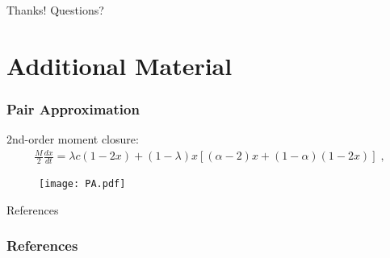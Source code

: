 \documentclass{beamer}
\begin{document}
		\begin{frame}[standout]
			Thanks! Questions? 
		\end{frame}
\section{Additional Material}
		
		\begin{frame}\frametitle{Pair Approximation}
		  	2nd-order moment closure: 
			\begin{align}
				\frac{M}{2}\frac{dx}{dt} = \lambda c(1-2x) + (1-\lambda) x\left[(\alpha - 2)x + (1-\alpha)(1-2x) \right]\;,
			\end{align}
			\begin{figure}
				\centering
				\texttt{[image: PA.pdf]}
				\caption{} \label{fig:}
			\end{figure}
		  	
		\end{frame}
	
	
		\begin{frame}[standout]
		References
		  
		\end{frame}

	
		\begin{frame}[allowframebreaks]\frametitle{References}
		 	
		 	\printbibliography[heading=none]
		\end{frame}

		
\end{document}
